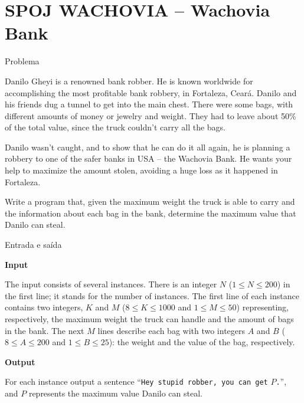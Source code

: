 \section{SPOJ WACHOVIA -- Wachovia Bank}

\begin{frame}[fragile]{Problema}

Danilo Gheyi is a renowned bank robber. He is known worldwide for accomplishing the most 
profitable bank robbery, in Fortaleza, Ceará. Danilo and his friends dug a tunnel to get into 
the main chest. There were some bags, with different amounts of money or jewelry and weight. 
They had to leave about 50\% of the total value, since the truck couldn't carry all the bags.

Danilo wasn't caught, and to show that he can do it all again, he is planning a robbery to one 
of the safer banks in USA -- the Wachovia Bank. He wants your help to maximize the amount 
stolen, avoiding a huge loss as it happened in Fortaleza.

Write a program that, given the maximum weight the truck is able to carry and the information 
about each bag in the bank, determine the maximum value that Danilo can steal.

\end{frame}

\begin{frame}[fragile]{Entrada e saída}

\textbf{Input}

The input consists of several instances. There is an integer $N$ ($1\leq N\leq 200$) in the 
first line; it stands for the number of instances. The first line of each instance contains two 
integers, $K$ and $M$ ($8\leq K\leq 1000$ and $1\leq M\leq 50$) representing, respectively, the 
maximum weight the truck can handle and the amount of bags in the bank. The next $M$ lines 
describe each bag with two integers $A$ and $B$ ($8\leq A\leq 200$ and $1\leq B\leq 25$): the 
weight and the value of the bag, respectively.

\textbf{Output}

For each instance output a sentence ``\texttt{Hey stupid robber, you can get} $P$\texttt{.}'',
and $P$ represents the maximum value Danilo can steal.

\end{frame}

